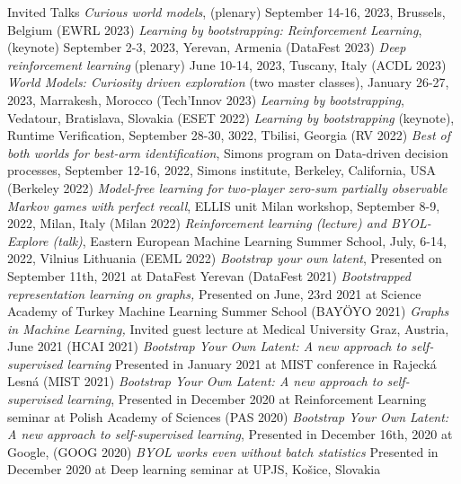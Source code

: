 \documentclass{resume}
\begin{document}
\begin{category}{Invited Talks}
	\citembullet
	\emph{Curious world models},  (plenary)
         September 14-16, 2023, Brussels, Belgium
	 ({\sf EWRL 2023})
	\citembullet
	\emph{Learning by bootstrapping: Reinforcement Learning},  (keynote)
         September 2-3, 2023, Yerevan, Armenia
	 ({\sf DataFest 2023})
	\citembullet
	\emph{Deep reinforcement learning}  (plenary)
         June 10-14, 2023, Tuscany, Italy
	 ({\sf ACDL 2023})
	\citembullet
	\emph{World Models: Curiosity driven exploration} (two master classes), 
         January 26-27, 2023, Marrakesh, Morocco
	 ({\sf  Tech'Innov 2023})	 
	\citembullet
	\emph{Learning by bootstrapping}, 
	 Vedatour, Bratislava, Slovakia
	 ({\sf ESET 2022})
	\citembullet
	\emph{Learning by bootstrapping} (keynote), 
	 Runtime Verification, September 28-30, 3022, Tbilisi, Georgia
	 ({\sf RV 2022})
\citembullet
\emph{Best of both worlds for best-arm identification}, 
 Simons program on Data-driven decision processes, September 12-16, 2022, Simons institute, Berkeley, California, USA
 ({\sf Berkeley 2022})
\citembullet
\emph{Model-free learning for two-player zero-sum partially observable Markov games with perfect recall}, 
 ELLIS unit Milan workshop, September 8-9, 2022,  Milan, Italy  
 ({\sf Milan 2022})
\citembullet
\emph{Reinforcement learning (lecture) and BYOL-Explore (talk)}, 
 Eastern European Machine Learning Summer School, July, 6-14, 2022, Vilnius Lithuania
 ({\sf EEML 2022})
\citembullet
\emph{Bootstrap your own latent}, 
Presented on September 11th, 2021 at  DataFest Yerevan
({\sf DataFest 2021})
\citembullet
\emph{Bootstrapped representation learning on graphs,} 
Presented on June, 23rd 2021 at  Science Academy of Turkey Machine Learning Summer School
({\sf BAY\"OYO  2021})
\citembullet
\emph{Graphs in Machine Learning,} 
Invited guest lecture at Medical University Graz, Austria, June 2021
({\sf HCAI  2021})
\citembullet
\emph{Bootstrap Your Own Latent: A new approach to self-supervised learning} 
Presented in January  2021 at MIST conference in Rajeck\' a Lesn\' a 
({\sf MIST  2021})
\citembullet
\emph{Bootstrap Your Own Latent: A new approach to self-supervised learning}, 
 Presented in December  2020 at Reinforcement Learning seminar at Polish Academy of Sciences
({\sf PAS  2020})
\citembullet
\emph{Bootstrap Your Own Latent: A new approach to self-supervised learning}, 
Presented in December 16th, 2020 at Google,
({\sf GOOG  2020})
\citembullet
\emph{BYOL works even without batch statistics} 
Presented in December  2020 at Deep learning seminar at UPJS, Ko\v{s}ice, Slovakia

\end{category}
\end{document}

